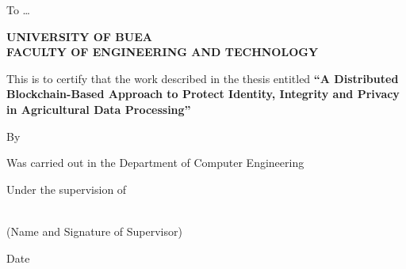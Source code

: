 \documentclass[12pt,a4paper,oneside]{book}
\begin{document}
\setcounter{page}{2}                     

\vspace{2\baselineskip}
\begin{center}
To \dots
\end{center}
\clearpage
\begin{singlespace}
\vspace{\baselineskip}
\begin{center}{\bfseries UNIVERSITY OF BUEA}\\
{\bfseries FACULTY OF ENGINEERING AND TECHNOLOGY}\end{center}
\vspace{2\baselineskip}

This is to certify that the work described in the thesis entitled
\textbf{``A Distributed Blockchain-Based Approach to Protect Identity,
Integrity and Privacy in Agricultural Data Processing''}

\vspace{\baselineskip}
By \hrulefill

\vspace{\baselineskip}
Was carried out in the Department of Computer Engineering

\vspace{\baselineskip}
Under the supervision of

\vspace{2\baselineskip}
\hrulefill\\
(Name and Signature of Supervisor)

\vspace{2\baselineskip}
Date \hrulefill
\end{singlespace}
\clearpage

\clearpage

\clearpage
 
\begin{singlespace}
\renewcommand{\contentsname}{}
\vspace{-3\baselineskip}
\tableofcontents
\end{singlespace}
\clearpage

\begin{singlespace}
\renewcommand{\listfigurename}{}
\vspace{-3\baselineskip}
\listoffigures
\end{singlespace}
\clearpage
\end{document}
